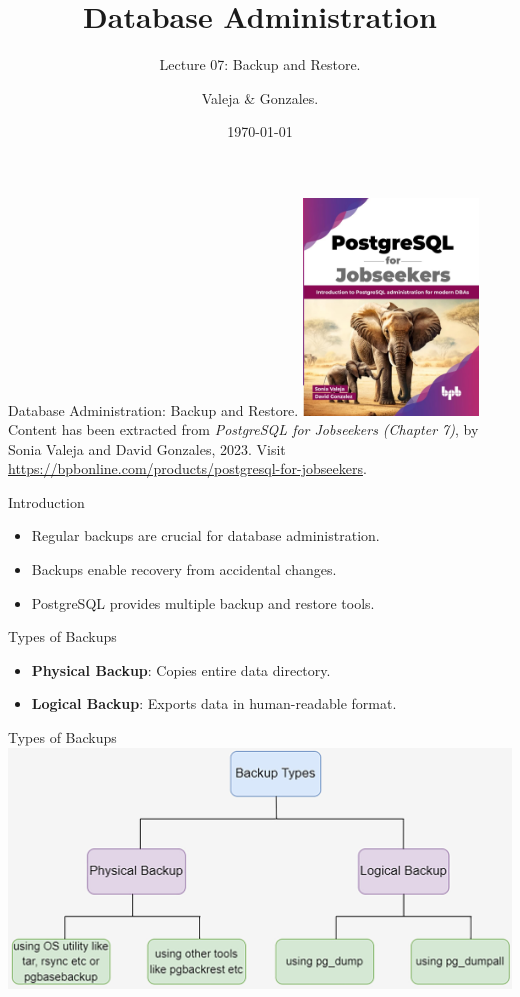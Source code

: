 \documentclass[aspectratio=169]{beamer}
\title[Backup / Restore]{Database Administration}
\subtitle{Lecture 07: Backup and Restore.}
\author{Valeja \& Gonzales.}
\date{\today}
\begin{document}
\frame{\titlepage}

\begin{frame}{Database Administration: Backup and Restore.}
    \centering
    \includegraphics[width=0.35\textwidth]{figures/book_cover}\\
    \vspace{2mm}
    {
        \scriptsize
        Content has been extracted from \textit{PostgreSQL for Jobseekers (Chapter 7)}, by Sonia Valeja and David Gonzales, 2023.  Visit \url{https://bpbonline.com/products/postgresql-for-jobseekers}.\\
    }
\end{frame}

\begin{frame}{Introduction}
    \begin{itemize}
        \item Regular backups are crucial for database administration.
        \item Backups enable recovery from accidental changes.
        \item PostgreSQL provides multiple backup and restore tools.
    \end{itemize}
\end{frame}

\begin{frame}{Types of Backups}
    \begin{itemize}
        \item \textbf{Physical Backup}: Copies entire data directory.
        \item \textbf{Logical Backup}: Exports data in human-readable format.
    \end{itemize}
\end{frame}

\begin{frame}{Types of Backups}
    \centering
    \includegraphics[width=\textwidth]{figures/backup_types}
\end{frame}
\end{document}
